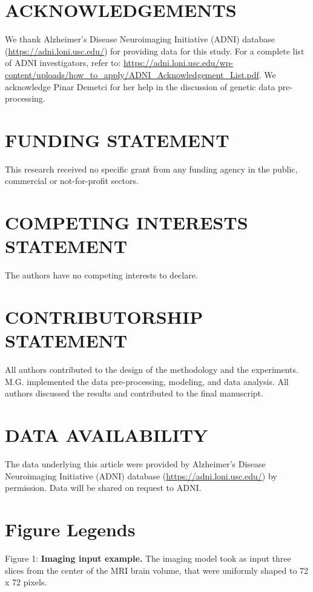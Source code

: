 \documentclass[11pt]{article}
\begin{document}
\section*{ACKNOWLEDGEMENTS} 
We thank Alzheimer’s Disease Neuroimaging Initiative (ADNI) database (\url{https://adni.loni.usc.edu/}) for providing data for this study. For a complete list of ADNI investigators, refer to: \url{https://adni.loni.usc.edu/wp-content/uploads/how_to_apply/ADNI_Acknowledgement_List.pdf}.
We acknowledge Pinar Demetci for her help in the discussion of genetic data pre-processing.

\section*{FUNDING STATEMENT}
This research received no specific grant from any funding agency in the public, commercial or not-for-profit sectors. 

\section*{COMPETING INTERESTS STATEMENT}
The authors have no competing interests to declare.

\section*{CONTRIBUTORSHIP STATEMENT}
All authors contributed to the design of the methodology and the experiments. M.G. implemented the data pre-processing, modeling, and data analysis. All authors discussed the results and contributed to the final manuscript.

\section*{DATA AVAILABILITY}
The data underlying this article were provided by Alzheimer’s Disease Neuroimaging Initiative (ADNI) database (\url{https://adni.loni.usc.edu/}) by permission. Data will be shared on request to ADNI.

\printbibliography
%
%
\section*{Figure Legends}

Figure 1: \textbf{Imaging input example.} The imaging model took as input three slices from the center of the MRI brain volume, that were uniformly shaped to 72 x 72 pixels.\newline
\end{document}
